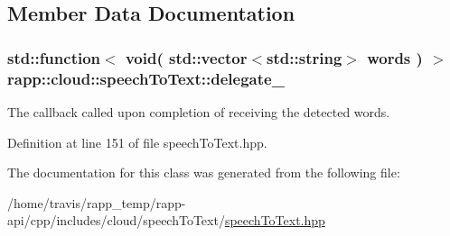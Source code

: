 \subsection{Member Data Documentation}
\hypertarget{classrapp_1_1cloud_1_1speechToText_a2b06ddad67ab4600f2179b7b04c01b51}{
\subsubsection[{delegate\-\_\-}]{\setlength{\rightskip}{0pt plus 5cm}std\-::function$<$ void( std\-::vector$<$std\-::string$>$ words ) $>$ rapp\-::cloud\-::speech\-To\-Text\-::delegate\-\_\-\hspace{0.3cm}{\ttfamily [private]}}}\label{classrapp_1_1cloud_1_1speechToText_a2b06ddad67ab4600f2179b7b04c01b51}


The callback called upon completion of receiving the detected words. 



Definition at line 151 of file speech\-To\-Text.\-hpp.



The documentation for this class was generated from the following file\-:\begin{DoxyCompactItemize}
\item 
/home/travis/rapp\-\_\-temp/rapp-\/api/cpp/includes/cloud/speech\-To\-Text/\hyperlink{speechToText_8hpp}{speech\-To\-Text.\-hpp}\end{DoxyCompactItemize}
